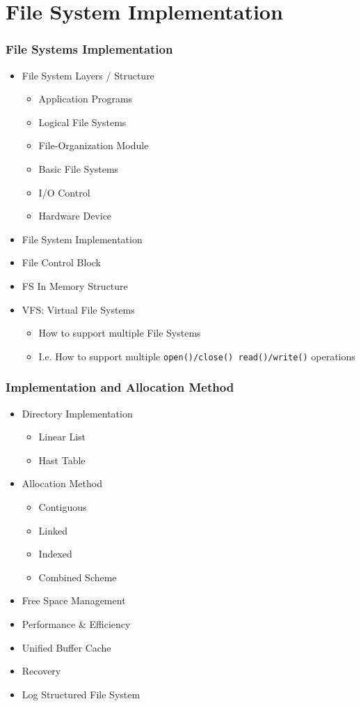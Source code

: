 \documentclass[xcolor=table, notheorems, hyperref={pdfpagelabels=false}]{beamer}
\begin{document}
\section{File System Implementation}
\begin{frame}[fragile]
\frametitle{File Systems Implementation}
\begin{itemize}
\item File System Layers / Structure
\begin{itemize}
\item Application Programs
\item Logical File Systems
\item File-Organization Module
\item Basic File Systems
\item I/O Control
\item Hardware Device
\end{itemize}
\item File System Implementation
\item File Control Block
\item FS In Memory Structure
\item VFS: Virtual File Systems
\begin{itemize}
\item How to support multiple File Systems
\item I.e. How to support multiple \texttt{open()/close() read()/write()} operations
\end{itemize}
\end{itemize}
\end{frame}

\begin{frame}[fragile]
\frametitle{Implementation and Allocation Method}
\begin{itemize}
\item Directory Implementation
\begin{itemize}
\item Linear List
\item Hast Table
\end{itemize}
\item {Allocation Method}
\begin{itemize}
\item Contiguous
\item Linked
\item Indexed
\item Combined Scheme
\end{itemize}
\item Free Space Management
\item Performance \& Efficiency
\item Unified Buffer Cache
\item Recovery
\item Log Structured File System
\end{itemize}
\end{frame}
\end{document}
